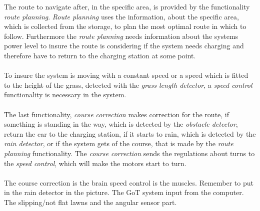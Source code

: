 The route to navigate after, in the specific area, is provided by the functionality \textit{route planning}. \textit{Route planning} uses the information, about the specific area, which is collected from the storage, to plan the most optimal route in which to follow. Furthermore the \textit{route planning} needs information about the systems power level to insure the route is considering if the system needs charging and therefore have to return to the charging station at some point.\\\\

To insure the system is moving with a constant speed or a speed which is fitted to the height of the grass, detected with the \textit{grass length detector}, a \textit{speed control} functionality is necessary in the system.\\\\

The last functionality, \textit{course correction} makes correction for the route, if something is standing in the way, which is detected by the \textit{obstacle detector}, return the car to the charging station, if it starts to rain, which is detected by the \textit{rain detector}, or if the system gets of the course, that is made by the \textit{route planning} functionality.
The \textit{course correction} sends the regulations about turns to the \textit{speed control}, which will make the motors start to turn.\\\\

The course correction is the brain speed control is the muscles. 
Remember to put in the rain detector in the picture.
The GoT system input from the computer.
The slipping/not flat lawns and the angular sensor part.



 
 